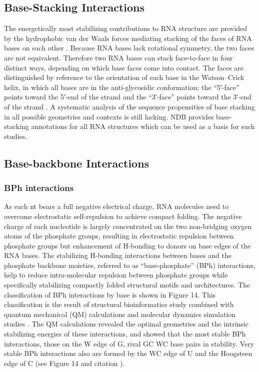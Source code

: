 \subsection{Base-Stacking Interactions}

The energetically most stabilizing contributions to RNA structure are provided
by the hydrophobic van der Waals forces mediating stacking of the faces of RNA
bases on each other \cite{Sponer2010}. Because RNA bases lack rotational
symmetry, the two faces are not equivalent. Therefore two RNA bases can stack
face-to-face in four distinct ways, depending on which base faces come into
contact. The faces are distinguished by reference to the orientation of each
base in the Watson–Crick helix, in which all bases are in the anti-glycosidic
conformation; the ``5′-face'' points toward the 5′-end of the strand and the
``3′-face'' points toward the 3′-end of the strand \cite{Hoehndorf2011,
Sarver2008a}. A systematic analysis of the sequence propensities of base
stacking in all possible geometries and contexts is still lacking. NDB provides
base-stacking annotations for all RNA structures which can be used as a basis
for such studies. 

\subsection{Base-backbone Interactions }

\subsubsection{BPh interactions}

As each nt bears a full negative electrical charge, RNA molecules need to
overcome electrostatic self-repulsion to achieve compact folding. The negative
charge of each nucleotide is largely concentrated on the two non-bridging oxygen
atoms of the phosphate groups, resulting in electrostatic repulsion between
phosphate groups but enhancement of H-bonding to donors on base edges of the RNA
bases.  The stabilizing H-bonding interactions between bases and the phosphate
backbone moieties, referred to as ``base-phosphate'' (BPh) interactions, help to
reduce intra-molecular repulsion between phosphate groups while specifically
stabilizing compactly folded structural motifs and architectures. The
classification of BPh interactions by base is shown in Figure 14. This
classification is the result of structural bioinformatics study combined with
quantum mechanical (QM) calculations and molecular dynamics simulation studies
\cite{Zirbel2009, Zgarbova2011a}. The QM calculations revealed the optimal
geometries and the intrinsic stabilizing energies of these interactions, and
showed that the most stable BPh interactions, those on the W edge of G, rival GC
WC base pairs in stability. Very stable BPh interactions also are formed by the
WC edge of U and the Hoogsteen edge of C (see Figure 14 and citation
\cite{Zirbel2009}).

